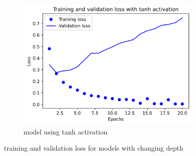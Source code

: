 \documentclass{article}
\begin{document}
\begin{figure}[H]
\begin{subfigure}{.5\textwidth}
            \includegraphics[width=\linewidth]{images/movies/7.png}
            \caption{model using tanh activation}
            \label{fig3:sfig3}
        \end{subfigure}
        \caption{training and validation loss for models with changing depth}
        \label{fig3:fig}
    \end{figure}
\end{document}
